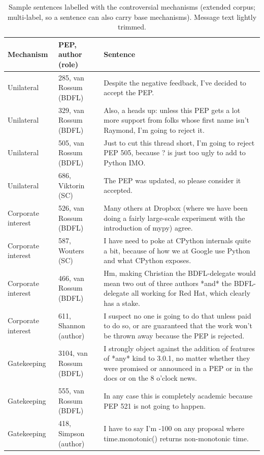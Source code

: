 \documentclass[sigconf,screen]{acmart}
\begin{document}
\begin{table}[t]
\caption{Sample sentences labelled with the controversial mechanisms (extended corpus; multi-label, so a sentence can also carry base mechanisms). Message text lightly trimmed.}
\label{tab:rq6examples}
\small
\begin{tabular}{p{}p{}p{}}
\toprule
Mechanism & PEP, author (role) & Sentence \\
\midrule
Unilateral & 285, van Rossum (BDFL) & Despite the negative feedback, I've decided to accept the PEP. \\
Unilateral & 329, van Rossum (BDFL) & Also, a heads up: unless this PEP gets a lot more support from folks whose first name isn't Raymond, I'm going to reject it. \\
Unilateral & 505, van Rossum (BDFL) & Just to cut this thread short, I'm going to reject PEP 505, because ? is just too ugly to add to Python IMO. \\
Unilateral & 686, Viktorin (SC) & The PEP was updated, so please consider it accepted. \\
Corporate interest & 526, van Rossum (BDFL) & Many others at Dropbox (where we have been doing a fairly large-scale experiment with the introduction of mypy) agree. \\
Corporate interest & 587, Wouters (SC) & I have need to poke at CPython internals quite a bit, because of how we at Google use Python and what CPython exposes. \\
Corporate interest & 466, van Rossum (BDFL) & Hm, making Christian the BDFL-delegate would mean two out of three authors *and* the BDFL-delegate all working for Red Hat, which clearly has a stake. \\
Corporate interest & 611, Shannon (author) & I suspect no one is going to do that unless paid to do so, or are guaranteed that the work won't be thrown away because the PEP is rejected. \\
Gatekeeping & 3104, van Rossum (BDFL) & I strongly object against the addition of features of *any* kind to 3.0.1, no matter whether they were promised or announced in a PEP or in the docs or on the 8 o'clock news. \\
Gatekeeping & 555, van Rossum (BDFL) & In any case this is completely academic because PEP 521 is not going to happen. \\
Gatekeeping & 418, Simpson (author) & I have to say I'm -100 on any proposal where time.monotonic() returns non-monotonic time. \\

\end{tabular}
\end{table}
\end{document}
